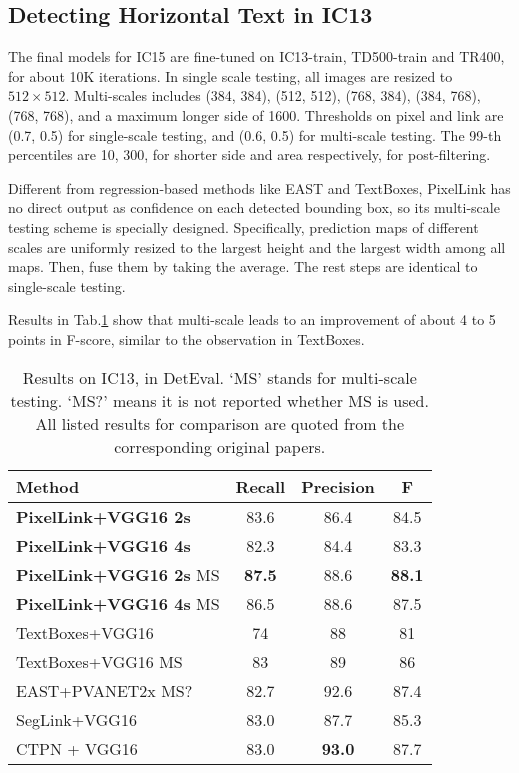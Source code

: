 \documentclass[letterpaper]{article} \usepackage{aaai18}  \usepackage{times}  \usepackage{helvet}  \usepackage{courier}  \usepackage{url}  \usepackage{graphicx}
\begin{document}
	\subsection{Detecting Horizontal Text in IC13}
	\label{sec:ic13-result}
	The final models for IC15 are fine-tuned on IC13-train, TD500-train and TR400, for about 10K iterations. In single scale testing, all images are resized to $512\times512$. Multi-scales includes (384, 384), (512, 512), (768, 384), (384, 768), (768, 768), and a maximum longer side of 1600. Thresholds on pixel and link are (0.7, 0.5) for single-scale testing, and (0.6, 0.5) for multi-scale testing. The 99-th percentiles are 10, 300, for shorter side and area respectively, for post-filtering.
	
	Different from regression-based methods like EAST and TextBoxes, PixelLink has no direct output as confidence on each detected bounding box, so its multi-scale testing scheme is specially designed. Specifically, prediction maps of different scales are uniformly resized to the largest height and the largest width among all maps. Then, fuse them by taking the average. The rest steps are identical to single-scale testing.
	
	Results in Tab.\ref{table:results-on-ic13} show that multi-scale leads to an improvement of about 4 to 5 points in F-score, similar to the observation in TextBoxes.
	\begin{table}
		\caption{Results on IC13, in DetEval. `MS' stands for multi-scale testing. `MS?' means it is not reported whether MS is used.  All listed results for comparison are quoted from the corresponding original papers.}
		\label{table:results-on-ic13}
		\begin{tabular}{|l|c|c|c|}
			\hline
			Method                  &Recall &Precision  &F\\
			\hline
			\hline
			\textbf{PixelLink+VGG16 2s}      &83.6   &86.4       &84.5\\ \hline
			\textbf{PixelLink+VGG16 4s}      &82.3   &84.4       &83.3\\ \hline
			\textbf{PixelLink+VGG16 2s} MS   &\textbf{87.5}  &88.6       &\textbf{88.1}\\ \hline
			\textbf{PixelLink+VGG16 4s} MS   &86.5  &88.6       &87.5\\ \hline
			TextBoxes+VGG16         &74     &88         &81  \\ \hline
			TextBoxes+VGG16 MS      &83     &89         &86  \\ \hline
			EAST+PVANET2x MS?          &82.7   &92.6       &87.4\\ \hline
			SegLink+VGG16              &83.0   &87.7       &85.3\\ \hline
			CTPN + VGG16            &83.0 &\textbf{93.0}&87.7\\ \hline
		\end{tabular}
	\end{table}
	
\end{document}
